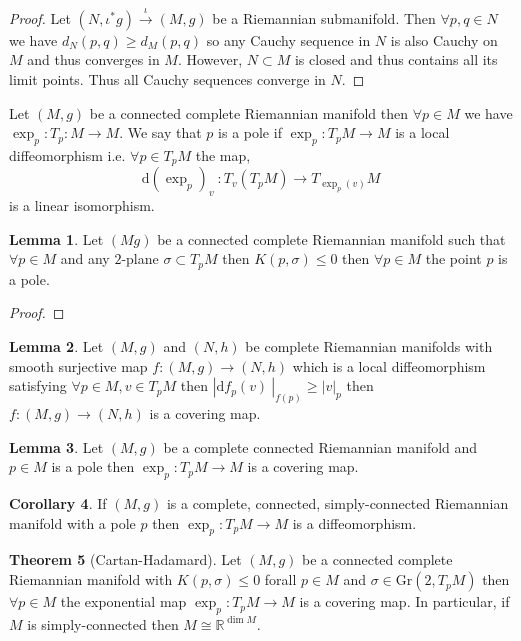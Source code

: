 \documentclass[12pt]{extarticle}
\newcommand{\R}{\mathbb{R}}
\renewcommand{\d}[1]{ \mathrm{d}#1 \:}
\theoremstyle{definition}
\newtheorem{theorem}{Theorem}[section]
\newtheorem{lemma}[theorem]{Lemma}
\newtheorem{corollary}[theorem]{Corollary}
\newenvironment{definition}[1][Definition:]{\begin{trivlist}
\item[\hskip \labelsep {\bfseries #1}]}{\end{trivlist}}
\begin{document}
\begin{proof}
Let $(N, \iota^* g) \xrightarrow{\iota} (M, g)$ be a Riemannian submanifold. Then $\forall p, q \in N$ we have $d_N(p, q) \ge d_M(p, q)$ so any Cauchy sequence in $N$ is also Cauchy on $M$ and thus converges in $M$. However, $N \subset M$ is closed and thus contains all its limit points. Thus all Cauchy sequences converge in $N$. 
\end{proof}

\begin{definition}
Let $(M, g)$ be a connected complete Riemannian manifold then $\forall p \in M$ we have $\exp_p : T_p : M \to M$. We say that $p$ is a pole if $\exp_p : T_p M \to M$ is a local diffeomorphism i.e. $\forall p \in T_p M$ the map,
\[ \d{(\exp_p)_v} : T_v (T_p M) \to T_{\exp_p(v)} M \]
is a linear isomorphism. 
\end{definition}

\begin{lemma}
Let $(M g)$ be a connected complete Riemannian manifold such that $\forall p \in M$ and any $2$-plane $\sigma \subset T_p M$ then $K(p, \sigma) \le 0$ then $\forall p \in M$ the point $p$ is a pole.
\end{lemma}

\begin{proof}

\end{proof}

\begin{lemma}
Let $(M, g)$ and $(N, h)$ be complete Riemannian manifolds with smooth surjective map $f : (M, g) \to (N, h)$ which is a local diffeomorphism satisfying $\forall p \in M, v \in T_p M$ then $|\d{f_p(v)} |_{f(p)} \ge |v|_p$ then $f : (M, g) \to (N, h)$ is a covering map. 
\end{lemma}

\begin{lemma}
Let $(M, g)$ be a complete connected Riemannian manifold and $p \in M$ is a pole then $\exp_p : T_p M \to M$ is a covering map. 
\end{lemma}

\begin{corollary}
If $(M, g)$ is a complete, connected, simply-connected Riemannian manifold with a pole $p$ then $\exp_p : T_p M \to M$ is a diffeomorphism. 
\end{corollary}

\begin{theorem}[Cartan-Hadamard]
Let $(M, g)$ be a connected complete Riemannian manifold with $K(p, \sigma) \le 0$ forall $p \in M$ and $\sigma \in \mathrm{Gr}(2, T_p M)$ then $\forall p \in M$ the exponential map $\exp_p : T_p M \to M$ is a covering map. In particular, if $M$ is simply-connected then $M \cong \R^{\dim{M}}$.  
\end{theorem}
\end{document}
